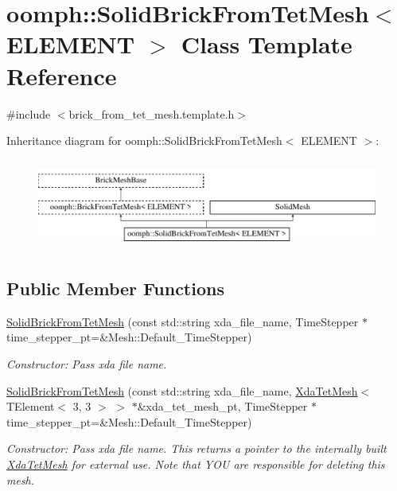 \hypertarget{classoomph_1_1SolidBrickFromTetMesh}{}\section{oomph\+:\+:Solid\+Brick\+From\+Tet\+Mesh$<$ E\+L\+E\+M\+E\+NT $>$ Class Template Reference}
\label{classoomph_1_1SolidBrickFromTetMesh}


{\ttfamily \#include $<$brick\+\_\+from\+\_\+tet\+\_\+mesh.\+template.\+h$>$}

Inheritance diagram for oomph\+:\+:Solid\+Brick\+From\+Tet\+Mesh$<$ E\+L\+E\+M\+E\+NT $>$\+:\begin{figure}[H]
\begin{center}
\leavevmode
\includegraphics[height=3.000000cm]{classoomph_1_1SolidBrickFromTetMesh}
\end{center}
\end{figure}
\subsection*{Public Member Functions}
\begin{DoxyCompactItemize}
\item 
\hyperlink{classoomph_1_1SolidBrickFromTetMesh_afffe8e29788d8f748fcc6aa9d818420d}{Solid\+Brick\+From\+Tet\+Mesh} (const std\+::string xda\+\_\+file\+\_\+name, Time\+Stepper $\ast$time\+\_\+stepper\+\_\+pt=\&Mesh\+::\+Default\+\_\+\+Time\+Stepper)
\begin{DoxyCompactList}\small\item\em Constructor\+: Pass xda file name. \end{DoxyCompactList}\item 
\hyperlink{classoomph_1_1SolidBrickFromTetMesh_a6d45c13e6c02bb636b23e72d32240619}{Solid\+Brick\+From\+Tet\+Mesh} (const std\+::string xda\+\_\+file\+\_\+name, \hyperlink{classoomph_1_1XdaTetMesh}{Xda\+Tet\+Mesh}$<$ T\+Element$<$ 3, 3 $>$ $>$ $\ast$\&xda\+\_\+tet\+\_\+mesh\+\_\+pt, Time\+Stepper $\ast$time\+\_\+stepper\+\_\+pt=\&Mesh\+::\+Default\+\_\+\+Time\+Stepper)
\begin{DoxyCompactList}\small\item\em Constructor\+: Pass xda file name. This returns a pointer to the internally built \hyperlink{classoomph_1_1XdaTetMesh}{Xda\+Tet\+Mesh} for external use. Note that Y\+OU are responsible for deleting this mesh. \end{DoxyCompactList}\end{DoxyCompactItemize}


